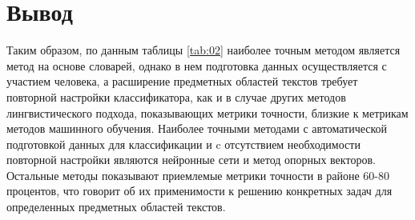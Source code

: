 \section{Вывод}

Таким образом, по данным таблицы \ref{tab:02} наиболее точным методом является
метод на основе словарей, однако в нем подготовка данных осуществляется с
участием человека, а расширение предметных областей текстов требует повторной
настройки классификатора, как и в случае других методов лингвистического
подхода, показывающих метрики точности, близкие к метрикам методов машинного
обучения. Наиболее точными методами с автоматической подготовкой данных для
классификации и c отсутствием необходимости повторной настройки являются
нейронные сети и метод опорных векторов. Остальные методы показывают приемлемые
метрики точности в районе 60-80 процентов, что говорит об их применимости к
решению конкретных задач для определенных предметных областей текстов.


